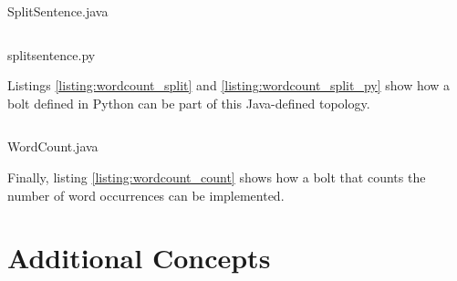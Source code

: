 \documentclass[bsc,logo,frontabs,twoside,singlespacing,normalheadings,parskip]{infthesis}     %
\begin{document}
\newpage

\begin{listing}[!htb]
\inputminted{java}{code/SplitSentence.java}
\caption{SplitSentence.java}
\label{listing:wordcount_split}
\end{listing}

\begin{listing}[!htb]
\inputminted{python}{code/splitsentence.py}
\caption{splitsentence.py}
\label{listing:wordcount_split_py}
\end{listing}

Listings \ref{listing:wordcount_split} and \ref{listing:wordcount_split_py} show how a bolt defined in Python can be part of this Java-defined topology.

\newpage

\begin{listing}[!htb]
\inputminted{java}{code/WordCount.java}
\caption{WordCount.java}
\label{listing:wordcount_count}
\end{listing}

Finally, listing \ref{listing:wordcount_count} shows how a bolt that counts the number of word occurrences can be implemented.


\section{Additional Concepts}
\end{document}
